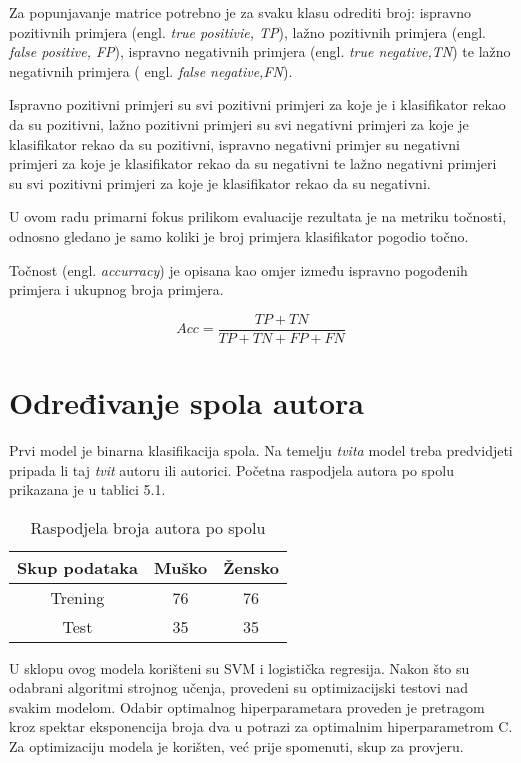 \documentclass[times, utf8, zavrsni]{fer}
\begin{document}
Za popunjavanje matrice potrebno je za svaku klasu odrediti broj: ispravno pozitivnih primjera (engl. \textit{true positivie, TP}), lažno pozitivnih primjera (engl. \textit{false positive, FP}), ispravno negativnih primjera (engl. \textit{true negative,TN}) te lažno negativnih primjera ( engl. \textit{false negative,FN}). 

Ispravno pozitivni primjeri su svi pozitivni primjeri za koje je i klasifikator rekao da su pozitivni, lažno pozitivni primjeri su svi negativni primjeri za koje je klasifikator rekao da su pozitivni, ispravno negativni primjer su negativni primjeri za koje je klasifikator rekao da su negativni te lažno negativni primjeri su svi pozitivni primjeri za koje je klasifikator rekao da su negativni. \newline

U ovom radu primarni fokus prilikom evaluacije rezultata je na metriku točnosti, odnosno gledano je samo koliki je broj primjera klasifikator pogodio točno.
 
Točnost (engl. \textit{accurracy}) je opisana kao omjer između ispravno pogođenih primjera i ukupnog broja primjera.
 
 	$$\textit{Acc} = \frac{TP + TN}{TP+TN+FP+FN}$$ \newline
 	
\section{Određivanje spola autora}

Prvi model je binarna klasifikacija spola. Na temelju \textit{tvita} model treba predvidjeti pripada li taj \textit{tvit} autoru ili autorici. Početna raspodjela autora po spolu prikazana je u tablici 5.1.\newline

\begin{table}[h!]
	\centering
	\begin{tabular}{||c |c | c||} 
		\hline
		Skup podataka & Muško & Žensko \\ [0.5ex] 
		\hline\hline
		Trening & 76 & 76 \\ 
		Test & 35 & 35  \\
		\hline
	\end{tabular}
	\caption{Raspodjela broja autora po spolu}
	\label{Table:1}
\end{table}

U sklopu ovog modela korišteni su SVM i logistička regresija. Nakon što su odabrani algoritmi strojnog učenja, provedeni su optimizacijski testovi nad svakim modelom. Odabir optimalnog hiperparametara proveden je pretragom kroz spektar eksponencija broja dva u potrazi za optimalnim hiperparametrom C. Za optimizaciju modela je korišten, već prije spomenuti, skup za provjeru. 
\end{document}
